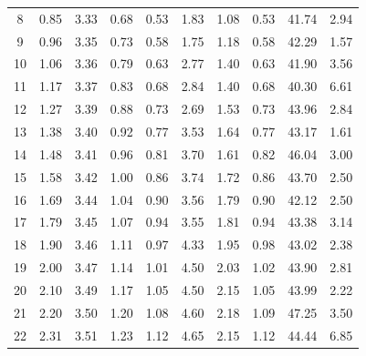 \documentclass{llncs}
\begin{document}
\begin{table}
\begin{scriptsize}
\begin{tabular}{|c|c|c|c|c|c|c|c|c|c|}
            8   & 0.85 & 3.33 & 0.68 & 0.53 & 1.83 & 1.08 & 0.53 & 41.74 & 2.94 \\
            9   & 0.96 & 3.35 & 0.73 & 0.58 & 1.75 & 1.18 & 0.58 & 42.29 & 1.57 \\
            10  & 1.06 & 3.36 & 0.79 & 0.63 & 2.77 & 1.40 & 0.63 & 41.90 & 3.56 \\
            11  & 1.17 & 3.37 & 0.83 & 0.68 & 2.84 & 1.40 & 0.68 & 40.30 & 6.61 \\
            12  & 1.27 & 3.39 & 0.88 & 0.73 & 2.69 & 1.53 & 0.73 & 43.96 & 2.84 \\
            13  & 1.38 & 3.40 & 0.92 & 0.77 & 3.53 & 1.64 & 0.77 & 43.17 & 1.61 \\
            14  & 1.48 & 3.41 & 0.96 & 0.81 & 3.70 & 1.61 & 0.82 & 46.04 & 3.00 \\
            15  & 1.58 & 3.42 & 1.00 & 0.86 & 3.74 & 1.72 & 0.86 & 43.70 & 2.50 \\
            16  & 1.69 & 3.44 & 1.04 & 0.90 & 3.56 & 1.79 & 0.90 & 42.12 & 2.50 \\
            17  & 1.79 & 3.45 & 1.07 & 0.94 & 3.55 & 1.81 & 0.94 & 43.38 & 3.14 \\
            18  & 1.90 & 3.46 & 1.11 & 0.97 & 4.33 & 1.95 & 0.98 & 43.02 & 2.38 \\
            19  & 2.00 & 3.47 & 1.14 & 1.01 & 4.50 & 2.03 & 1.02 & 43.90 & 2.81 \\
            20  & 2.10 & 3.49 & 1.17 & 1.05 & 4.50 & 2.15 & 1.05 & 43.99 & 2.22 \\
            21  & 2.20 & 3.50 & 1.20 & 1.08 & 4.60 & 2.18 & 1.09 & 47.25 & 3.50 \\
            22  & 2.31 & 3.51 & 1.23 & 1.12 & 4.65 & 2.15 & 1.12 & 44.44 & 6.85 \\ \hline
        \end{tabular}
    \end{scriptsize}
    \justify
\end{table}
\end{document}
